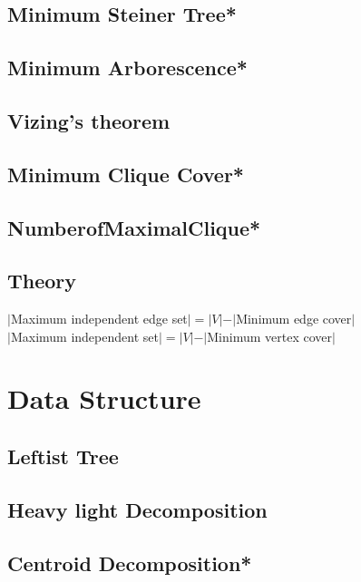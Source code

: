 \subsection{Minimum Steiner Tree*} %

\subsection{Minimum Arborescence*} %

\subsection{Vizing's theorem}

\subsection{Minimum Clique Cover*} %

\subsection{NumberofMaximalClique*} %

\subsection{Theory}
\begin{footnotesize}
$|$Maximum independent edge set$|=|V|-|$Minimum edge cover$|$\\
$|$Maximum independent set$|=|V|-|$Minimum vertex cover$|$\\
\end{footnotesize}


\section{Data Structure}
\subsection{Leftist Tree}

\subsection{Heavy light Decomposition}

\subsection{Centroid Decomposition*} %

% 
% 
